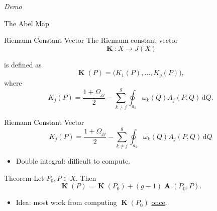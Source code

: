 \documentclass{beamer}
\newcommand{\dQ}{\,\mathrm{d}Q}
\DeclareMathOperator{\RCV}{\boldsymbol{K}}
\DeclareMathOperator{\Abel}{\boldsymbol{A}}
\begin{document}
\begin{frame}
  \vspace{32pt}
  \begin{center}
    {\Huge \it Demo}

    \vspace{24pt}

    The Abel Map
  \end{center}
\end{frame}


\begin{frame}{Riemann Constant Vector}
  The Riemann constant vector
  \[
  \RCV : X \to J(X)
  \]

  \pause

  is defined as
  \[
  \RCV(P) = \big( K_1(P), \ldots, K_g(P) \big),
  \]
  where
  \[
  K_j(P) = \frac{1 + \Omega_{jj}}{2} - \sum_{k \neq j}^g
           \oint_{a_k} \omega_k(Q) A_j(P,Q) \dQ.
  \]
\end{frame}


\begin{frame}{Riemann Constant Vector}
  \[
  K_j(P) = \frac{1 + \Omega_{jj}}{2} - \sum_{k \neq j}^g
           \oint_{a_k} \omega_k(Q) A_j(P,Q) \dQ
  \]

  \begin{itemize}
  \item Double integral: difficult to compute.
  \end{itemize}

  \pause

  \begin{block}{Theorem}
    Let $P_0,P \in X$. Then
    \[
    \RCV(P) = \RCV(P_0) + (g-1)\Abel(P_0,P).
    \]
  \end{block}

  \pause

  \begin{itemize}
  \item Idea: most work from computing $\RCV(P_0)$ \underline{once}.
  \end{itemize}
\end{frame}
\end{document}
